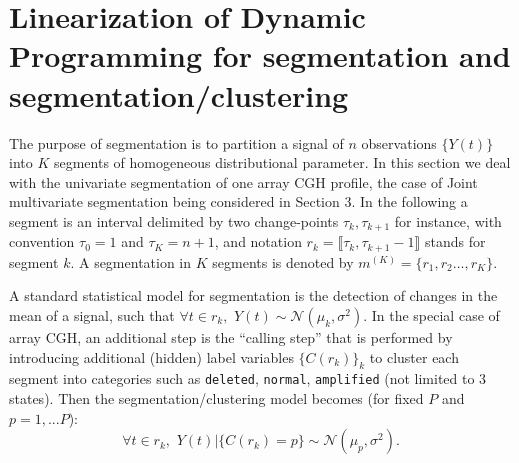 \documentclass[11pt]{llncs}
\begin{document}
\section{Linearization of Dynamic Programming for segmentation and segmentation/clustering} 

The purpose of segmentation is to partition a signal of $n$ observations $\{Y(t)\}$ into $K$ segments of homogeneous distributional parameter. In this section we deal with the univariate segmentation of one array CGH profile, the case of Joint multivariate segmentation being considered in Section 3. In the following a segment is an interval delimited by two change-points $\tau_k, \tau_{k+1}$ for instance,  with convention $\tau_0 = 1$ and $\tau_K = n+1$, and notation $r_k=\llbracket \tau_k, \tau_{k+1} -1\rrbracket$ stands for segment $k$. A segmentation in $K$ segments is denoted by $m^{(K)} = \{r_1, r_2 \ldots, r_K\}$.

A standard statistical model for segmentation is the detection of changes in the mean of a signal, such that $\forall t \in r_k, \,\, Y(t)\sim \mathcal{N}(\mu_k,\sigma^2).$ In the special case of array CGH, an additional step is the ``calling step'' that is performed by introducing additional (hidden) label variables $\{C(r_k)\}_k$ to cluster each segment into categories such as \texttt{deleted}, \texttt{normal}, \texttt{amplified} (not limited to 3 states). Then the segmentation/clustering model becomes (for fixed $P$ and $p=1,...P$):  $$\forall t \in r_k, \,\, Y(t)|\{C(r_k)=p\} \sim \mathcal{N}(\mu_p,\sigma^2).$$
\end{document}
